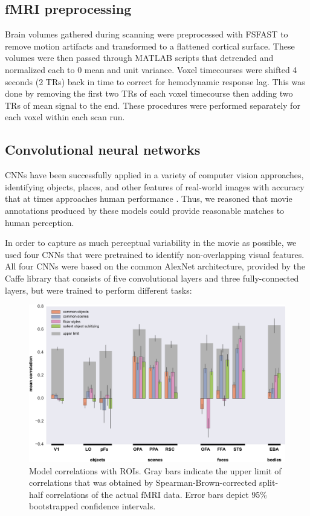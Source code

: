 \documentclass[10pt,twocolumn,letterpaper]{article}
\begin{document}
\subsection{fMRI preprocessing}

Brain volumes gathered during scanning were preprocessed with FSFAST to remove motion artifacts and transformed to a flattened cortical surface. These volumes were then passed through MATLAB scripts that detrended and normalized each to 0 mean and unit variance. Voxel timecourses were shifted 4 seconds (2 TRs) back in time to correct for hemodynamic response lag. This was done by removing the first two TRs of each voxel timecourse then adding two TRs of mean signal to the end. These procedures were performed separately for each voxel within each scan run.

\subsection{Convolutional neural networks}
CNNs have been successfully applied in a variety of computer vision approaches, identifying objects, places, and other features of real-world images with accuracy that at times approaches human performance \cite{krizhevsky2012imagenet, szegedy2014going}. Thus, we reasoned that movie annotations produced by these models could provide reasonable matches to human perception.

In order to capture as much perceptual variability in the movie as possible, we used four CNNs that were pretrained to identify non-overlapping visual features. All four CNNs were based on the common AlexNet architecture, provided by the Caffe library \cite{jia2014caffe} that consists of five convolutional layers and three fully-connected layers, but were trained to perform different tasks:

\begin{figure}
\begin{center}
\includegraphics[width=0.8\linewidth]{preds.png}
\end{center}
   \caption{Model correlations with ROIs. Gray bars indicate the upper limit of correlations that was obtained by Spearman-Brown-corrected split-half correlations of the actual fMRI data. Error bars depict 95\% bootstrapped confidence intervals.}
\label{fig:preds}
\end{figure}
\end{document}
